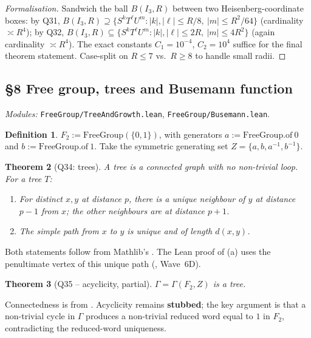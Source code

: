 \documentclass[11pt,a4paper]{article}
\newcommand{\todoc}[1]{\textcolor{todoamber}{\textbf{#1}}}
\newcommand{\lmod}[1]{\texttt{\small #1}}
\theoremstyle{plain}
\newtheorem{theorem}{Theorem}[section]
\theoremstyle{definition}
\newtheorem{definition}[theorem]{Definition}
\begin{document}
\begin{proof}[Formalisation]
Sandwich the ball $B(I_3, R)$ between two Heisenberg-coordinate boxes:
by Q31, $B(I_3, R) \supseteq \{S^k T^\ell U^m : |k|, |\ell|\leq R/8,\
|m|\leq R^2/64\}$ (cardinality $\asymp R^4$);
by Q32, $B(I_3, R) \subseteq \{S^k T^\ell U^m : |k|, |\ell|\leq 2R,\ |m|\leq 4 R^2\}$
(again cardinality $\asymp R^4$). The exact constants $C_1 = 10^{-4}$,
$C_2 = 10^4$ suffice for the final theorem statement. Case-split on
$R \leq 7$ vs.\ $R \geq 8$ to handle small radii.
\end{proof}

\subsection{\S8 Free group, trees and Busemann function}
\emph{Modules:} \lmod{FreeGroup/TreeAndGrowth.lean},
\lmod{FreeGroup/Busemann.lean}.

\begin{definition}
$F_2 := \text{FreeGroup}(\{0, 1\})$, with generators
$a := \text{FreeGroup.of}\ 0$ and $b := \text{FreeGroup.of}\ 1$.
Take the symmetric generating set
$Z = \{a, b, a^{-1}, b^{-1}\}$.
\end{definition}

\begin{theorem}[Q34: trees]
A \emph{tree} is a connected graph with no non-trivial loop.
For a tree $T$:
\begin{enumerate}[label=(\alph*), leftmargin=2em]
  \item For distinct $x, y$ at distance $p$, there is a unique neighbour
        of $y$ at distance $p-1$ from $x$; the other neighbours are at
        distance $p+1$.
  \item The simple path from $x$ to $y$ is unique and of length
        $d(x, y)$.
\end{enumerate}
\end{theorem}

Both statements follow from Mathlib's
. The Lean proof of
(a) uses the penultimate vertex of this unique path
(, Wave~6D).

\begin{theorem}[Q35 -- acyclicity, partial]
$\Gamma = \Gamma(F_2, Z)$ is a tree.
\end{theorem}

Connectedness is from . Acyclicity
remains \todoc{stubbed}; the key argument is that a non-trivial cycle in
$\Gamma$ produces a non-trivial reduced word equal to $1$ in $F_2$,
contradicting the reduced-word uniqueness.
\end{document}

